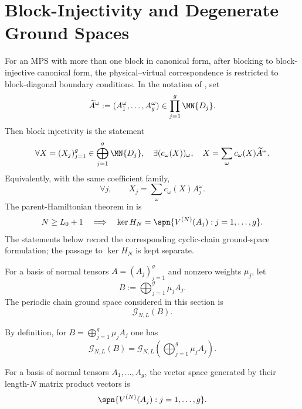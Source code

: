 \section{Block-Injectivity and Degenerate Ground Spaces}\label{sec:degenerate_ground_space}

For an MPS with more than one block in canonical form, after blocking to
block-injective canonical form, the physical--virtual correspondence is
restricted to block-diagonal boundary conditions.  In the notation of
\cite[lines~2113--2117]{Cirac2021Matrix}, set
\[
    \widetilde A^\omega:=(A_1^\omega,\ldots,A_g^\omega)
    \in\prod_{j=1}^g \MN{D_j}.
\]
Then block injectivity is the statement
\[
    \forall X=(X_j)_{j=1}^g\in\bigoplus_{j=1}^g \MN{D_j},
    \quad
    \exists (c_\omega(X))_\omega,
    \quad
    X=\sum_\omega c_\omega(X)\widetilde A^\omega.
\]
Equivalently, with the same coefficient family,
\[
    \forall j,\qquad
    X_j=\sum_\omega c_\omega(X)A_j^\omega .
\]
The parent-Hamiltonian theorem in \cite[lines~2121--2128]{Cirac2021Matrix} is
\[
    N\ge L_0+1
    \quad\Longrightarrow\quad
    \ker H_N=\spn\{V^{(N)}(A_j):j=1,\ldots,g\}.
\]
The statements below record the corresponding cyclic-chain ground-space
formulation; the passage to $\ker H_N$ is kept separate.

\begin{definition}
    \label{def:parent_hamiltonian_ground_space_bnt}
    \notready
    For a basis of normal tensors $A=(A_j)_{j=1}^g$ and nonzero weights
    $\mu_j$, let
    \[
        B := \bigoplus_{j=1}^g \mu_j A_j .
    \]
    The periodic chain ground space considered in this section is
    \[
        \mathcal G_{N,L}(B).
    \]
\end{definition}

\begin{lemma}
    \label{lem:parent_hamiltonian_ground_space_eq}
    \notready
    By definition, for $B=\bigoplus_{j=1}^g \mu_j A_j$ one has
    \[
        \mathcal G_{N,L}(B)
        =
        \mathcal G_{N,L}\!\left(\bigoplus_{j=1}^g \mu_j A_j\right).
    \]
\end{lemma}

\begin{definition}
    \label{def:bnt_span}
    \notready
    For a basis of normal tensors $A_1,\ldots,A_g$, the vector space generated
    by their length-$N$ matrix product vectors is
    \[
        \spn\{V^{(N)}(A_j): j=1,\ldots,g\}.
    \]
\end{definition}

